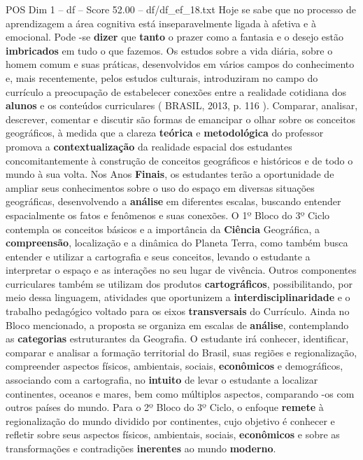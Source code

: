 \begin{textsample}{POS Dim 1 – df – Score 52.00 – df/df\_ef\_18.txt}
Hoje se sabe que no processo de aprendizagem a área cognitiva está inseparavelmente ligada à afetiva e à emocional.
Pode -se \textbf{dizer} que \textbf{tanto} o prazer como a fantasia e o desejo estão \textbf{imbricados} em tudo o que fazemos.
Os estudos sobre a vida diária, sobre o homem comum e suas práticas, desenvolvidos em vários campos do conhecimento e, mais recentemente, pelos estudos culturais, introduziram no campo do currículo a preocupação de estabelecer conexões entre a realidade cotidiana dos \textbf{alunos} e os conteúdos curriculares ( BRASIL, 2013, p. 116 ).
Comparar, analisar, descrever, comentar e discutir são formas de emancipar o olhar sobre os conceitos geográficos, à medida que a clareza \textbf{teórica} e \textbf{metodológica} do professor promova a \textbf{contextualização} da realidade espacial dos estudantes concomitantemente à construção de conceitos geográficos e históricos e de todo o mundo à sua volta.
Nos Anos \textbf{Finais}, os estudantes terão a oportunidade de ampliar seus conhecimentos sobre o uso do espaço em diversas situações geográficas, desenvolvendo a \textbf{análise} em diferentes escalas, buscando entender espacialmente os fatos e fenômenos e suas conexões.
O 1º Bloco do 3º Ciclo contempla os conceitos básicos e a importância da \textbf{Ciência} Geográfica, a \textbf{compreensão}, localização e a dinâmica do Planeta Terra, como também busca entender e utilizar a cartografia e seus conceitos, levando o estudante a interpretar o espaço e as interações no seu lugar de vivência.
Outros componentes curriculares também se utilizam dos produtos \textbf{cartográficos}, possibilitando, por meio dessa linguagem, atividades que oportunizem a \textbf{interdisciplinaridade} e o trabalho pedagógico voltado para os eixos \textbf{transversais} do Currículo.
Ainda no Bloco mencionado, a proposta se organiza em escalas de \textbf{análise}, contemplando as \textbf{categorias} estruturantes da Geografia.
O estudante irá conhecer, identificar, comparar e analisar a formação territorial do Brasil, suas regiões e regionalização, compreender aspectos físicos, ambientais, sociais, \textbf{econômicos} e demográficos, associando com a cartografia, no \textbf{intuito} de levar o estudante a localizar continentes, oceanos e mares, bem como múltiplos aspectos, comparando -os com outros países do mundo.
Para o 2º Bloco do 3º Ciclo, o enfoque \textbf{remete} à regionalização do mundo dividido por continentes, cujo objetivo é conhecer e refletir sobre seus aspectos físicos, ambientais, sociais, \textbf{econômicos} e sobre as transformações e contradições \textbf{inerentes} ao mundo \textbf{moderno}.

\end{textsample}

